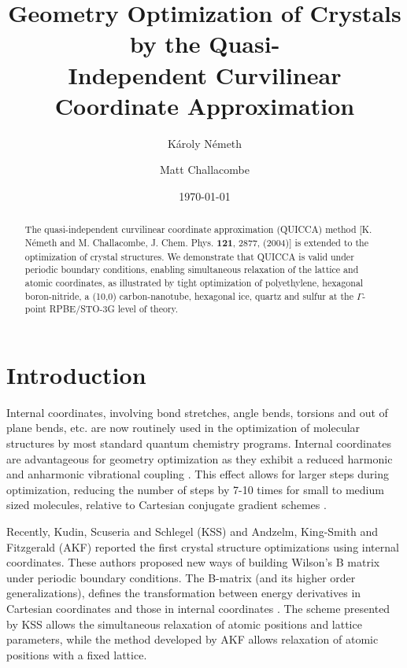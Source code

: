 \twolinestyle{\documentclass[prb,preprint]{revtex4}}
\begin{document}
\title{Geometry Optimization of Crystals by the Quasi-\\
       Independent Curvilinear Coordinate Approximation }


\author{K\'aroly N\'emeth}
\author{Matt Challacombe}

\date{\today}

\begin{abstract}
The quasi-independent curvilinear coordinate approximation (QUICCA) method 
[K. N\'emeth and M. Challacombe, J. Chem. Phys. {\bf 121}, 2877, (2004)] 
is extended to the optimization of crystal structures.  We demonstrate that QUICCA 
is valid under periodic boundary conditions, enabling simultaneous relaxation of the 
lattice and atomic coordinates, as illustrated by tight optimization of 
polyethylene, hexagonal boron-nitride, a (10,0) carbon-nanotube, hexagonal ice,
quartz and sulfur at the $\Gamma$-point RPBE/STO-3G level of theory.
\end{abstract}


\maketitle


\section{Introduction}
Internal coordinates, involving bond stretches, angle bends, torsions and out of plane bends, etc. 
are now routinely used in the optimization of 
molecular structures by most standard quantum chemistry programs. 
Internal coordinates are advantageous for geometry optimization as 
they exhibit a reduced harmonic and anharmonic vibrational coupling 
\cite{PPulay69,GFogarasi79,GFogarasi92,PPulay77}.
This effect allows for larger steps during optimization, reducing the 
number of steps by 7-10 times for small to medium sized molecules, relative 
to Cartesian conjugate gradient schemes \cite{TBucko05}.

Recently, Kudin, Scuseria and Schlegel (KSS) \cite{KKudin01} and Andzelm, King-Smith and Fitzgerald (AKF) 
\cite{JAndzelm01}
reported the first crystal structure optimizations using internal coordinates.
These authors proposed new ways of building Wilson's B matrix \cite{EWilson55} 
under periodic boundary conditions.  The B-matrix (and its higher order generalizations), 
defines the transformation between energy derivatives in Cartesian coordinates and those 
in internal coordinates \cite{EWilson55,MChallacombe91}. 
The scheme presented by KSS allows the simultaneous relaxation of atomic positions and lattice parameters,
while the method developed by AKF allows relaxation of atomic positions with a fixed lattice.
\end{document}
